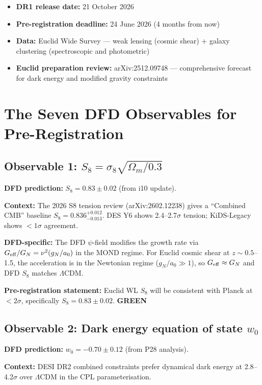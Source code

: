 \documentclass[11pt,a4paper]{article}
\newcommand{\GREEN}{\textcolor{dfdgreen}{\textbf{GREEN}}}
\begin{document}
\begin{itemize}
\item \textbf{DR1 release date:} 21 October 2026
\item \textbf{Pre-registration deadline:} 24 June 2026 (4 months from now)
\item \textbf{Data:} Euclid Wide Survey --- weak lensing (cosmic shear) + galaxy clustering (spectroscopic and photometric)
\item \textbf{Euclid preparation review:} arXiv:2512.09748 --- comprehensive forecast for dark energy and modified gravity constraints
\end{itemize}

\section{The Seven DFD Observables for Pre-Registration}

\subsection{Observable 1: $S_8 = \sigma_8\sqrt{\Omega_m/0.3}$}

\textbf{DFD prediction:} $S_8 = 0.83 \pm 0.02$ (from i10 update).

\textbf{Context:} The 2026 S8 tension review (arXiv:2602.12238) gives a ``Combined CMB'' baseline $S_8 = 0.836^{+0.012}_{-0.013}$. DES Y6 shows 2.4--2.7$\sigma$ tension; KiDS-Legacy shows $< 1\sigma$ agreement.

\textbf{DFD-specific:} The DFD $\psi$-field modifies the growth rate via $G_{\rm eff}/G_N = \nu^2(g_N/a_0)$ in the MOND regime. For Euclid cosmic shear at $z \sim 0.5$--1.5, the acceleration is in the Newtonian regime ($g_N/a_0 \gg 1$), so $G_{\rm eff} \approx G_N$ and DFD $S_8$ matches $\Lambda$CDM.

\textbf{Pre-registration statement:} Euclid WL $S_8$ will be consistent with Planck at $< 2\sigma$, specifically $S_8 = 0.83 \pm 0.02$. \GREEN{}

\subsection{Observable 2: Dark energy equation of state $w_0$}

\textbf{DFD prediction:} $w_0 = -0.70 \pm 0.12$ (from P28 analysis).

\textbf{Context:} DESI DR2 combined constraints prefer dynamical dark energy at 2.8--4.2$\sigma$ over $\Lambda$CDM in the CPL parameterisation.
\end{document}
